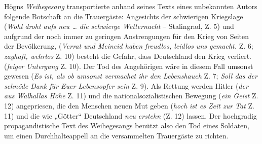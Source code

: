 \documentclass{book}
\begin{document}


Högns \textit{Weihegesang} transportierte anhand seines Texts eines
unbekannten Au\-tors folgende Botschaft an die Trauergäste: Angesichts
der schwierigen Kriegslage (\textit{Wohl droht aufs neu … die schwierge
Wetternacht }– Stalingrad, Z. 5) und aufgrund der noch immer zu
geringen Anstrengungen für den Krieg von Seiten der Bevölkerung,
(\textit{Verrat und Meineid haben freudlos, leidlos uns gemacht. }Z. 6;
\textit{zaghaft, wehrlos} Z. 10) besteht die Gefahr, dass Deutschland
den Krieg ver\-liert. (\textit{feiger Untergang }Z. 10). Der Tod des
Angehörigen wäre in diesem Fall um\-sonst gewesen (\textit{Es ist, als
ob umsonst vermachet ihr den Lebenshauch} Z. 7;\textit{ Soll das der
schnöde Dank für Euer Lebensopfer sein} Z. 9). Als Rettung werden
Hitler (\textit{der aus Walhallas Höhe }Z. 11) und die
nationalsozialistischen Bewegung (\textit{ein Geist }Z. 12)
angepriesen, die den Menschen neuen Mut geben (\textit{hoch ist es Zeit
zur Tat} Z. 11) und die wie „Götter“ Deutschland \textit{neu erstehn}
(Z. 12) lassen. Der hochgra\-dig propagandistische Text des
Weihegesangs benützt also den Tod eines Sol\-daten, um einen
Durchhalteappell an die versammelten Trauergäste zu rich\-ten.
\end{document}
